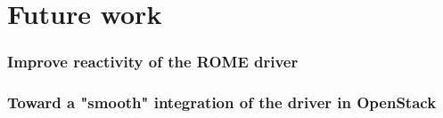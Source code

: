 \chapter{Future work}
\label{sec:future_work}

\subsection{Improve reactivity of the ROME driver}


\subsection{Toward a "smooth" integration of the driver in OpenStack}

